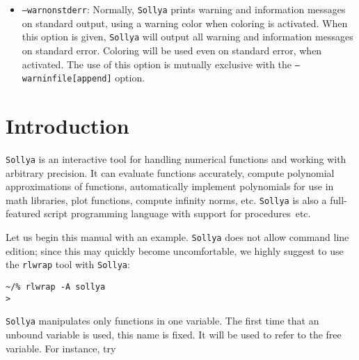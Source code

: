 \documentclass[a4paper]{article}
\newcommand{\sollya}{\texttt{Sollya}\xspace}
\newcommand{\rlwrap}{\texttt{rlwrap}\xspace}
\begin{document}
\begin{itemize}
  \texttt{--warninfile} is used, the existing content (if any) of the
  file is first removed before writing to the file. With
  \texttt{--warninfileappend}, the messages are appended to an
  existing file. Even if coloring is used for the displaying all other
  \sollya output, no coloring sequences are ever written to the
  file. Let us emphasize on the fact that any file of a unixoid system
  can be used for output, for instance also a named pipe. This allows
  for error messaging to be performed on a separate terminal. The use
  of this option is mutually exclusive with the
  \texttt{--warnonstderr} option.
\item \texttt{--warnonstderr}: Normally, \sollya prints warning and
  information messages on standard output, using a warning color 
  when coloring is activated. When this option is given, \sollya will 
  output all warning and information messages on standard error. Coloring
  will be used even on standard error, when activated. The use of 
  this option is mutually exclusive with the \texttt{--warninfile[append]} 
  option.
\end{itemize}


\section{Introduction}
\label{sec:introduction}
\sollya is an interactive tool for handling numerical functions and working with arbitrary precision. It can evaluate functions accurately, compute polynomial approximations of functions, automatically implement polynomials for use in math libraries, plot functions, compute infinity norms, etc. \sollya is also a full-featured script programming language with support for procedures~etc.

Let us begin this manual with an example. \sollya does not allow command line edition; since this may quickly become uncomfortable, we highly suggest to use the \rlwrap tool with \sollya:

\begin{center}\begin{minipage}{15cm}\begin{Verbatim}[frame=single]
~/% rlwrap -A sollya
>
\end{Verbatim}
\end{minipage}\end{center}

\sollya manipulates only functions in one variable. The first time that an unbound variable is used, this name is fixed. It will be used to refer to the free variable. For instance, try
\end{document}
